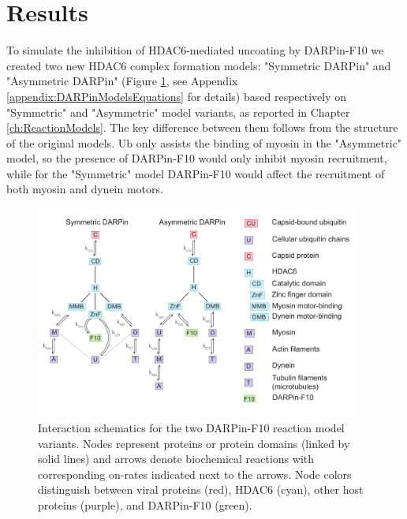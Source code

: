 \section{Results}

To simulate the inhibition of HDAC6-mediated uncoating by DARPin-F10 we created two new HDAC6 complex formation models: "Symmetric DARPin" and "Asymmetric DARPin" (Figure \ref{figure:darpinReactionModelSchemes}, see Appendix \ref{appendix:DARPinModelsEquations} for details) based respectively on "Symmetric" and "Asymmetric" model variants, as reported in Chapter \ref{ch:ReactionModels}. The key difference between them follows from the structure of the original models. Ub only assists the binding of myosin in the "Asymmetric" model, so the presence of DARPin-F10 would only inhibit myosin recruitment, while for the "Symmetric" model DARPin-F10 would affect the recruitment of both myosin and dynein motors.

\begin{figure}
\begin{center}
\includegraphics[width=0.95\textwidth, trim={0cm 0cm 0cm 0cm}, clip]{D_chapters/3_DARPinModels/ReactionModelSchemesDarpin.pdf}
\caption[HDAC6 complex formation models densities with and without DARPin-F10]%
{Interaction schematics for the two DARPin-F10 reaction model variants. Nodes represent proteins or protein domains (linked by solid lines) and arrows denote biochemical reactions with corresponding on-rates indicated next to the arrows. Node colors distinguish between viral proteins (red), HDAC6 (cyan), other host proteins (purple), and DARPin-F10 (green).}
\label{figure:darpinReactionModelSchemes}
\end{center}
\end{figure}

